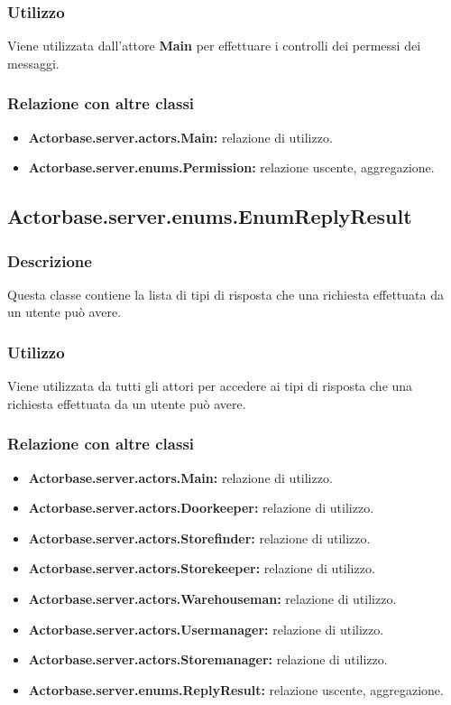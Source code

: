 \documentclass[a4paper]{article}
\begin{document}
			\subsubsection{Utilizzo}
				Viene utilizzata dall'attore \textbf{Main} per effettuare i controlli dei permessi dei messaggi. 				
				
			\subsubsection{Relazione con altre classi}
				\begin{itemize}
					\item \textbf{Actorbase.server.actors.Main:} relazione di utilizzo.
					\item \textbf{Actorbase.server.enums.Permission:} relazione uscente, aggregazione.
				\end{itemize}
				
		\subsection{Actorbase.server.enums.EnumReplyResult}
			\subsubsection{Descrizione}
				Questa classe contiene la lista di tipi di risposta che una richiesta effettuata da un utente può avere.
			\subsubsection{Utilizzo}
				Viene utilizzata da tutti gli attori per accedere ai tipi di risposta che una richiesta effettuata da un utente può avere.
				
			\subsubsection{Relazione con altre classi}
				\begin{itemize}
					\item \textbf{Actorbase.server.actors.Main:} relazione di utilizzo.
					\item \textbf{Actorbase.server.actors.Doorkeeper:} relazione di utilizzo.
					\item \textbf{Actorbase.server.actors.Storefinder:} relazione di utilizzo.
					\item \textbf{Actorbase.server.actors.Storekeeper:} relazione di utilizzo.
					\item \textbf{Actorbase.server.actors.Warehouseman:} relazione di utilizzo.
					\item \textbf{Actorbase.server.actors.Usermanager:} relazione di utilizzo.
					\item \textbf{Actorbase.server.actors.Storemanager:} relazione di utilizzo.
					\item \textbf{Actorbase.server.enums.ReplyResult:} relazione uscente, aggregazione.
				\end{itemize}
				
\end{document}
